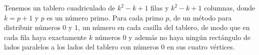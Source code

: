 Tenemos un tablero cuadriculado de $k^2 - k + 1$ filas y $k^2 - k + 1$ columnas, donde $k = p+1$ y $p$ es un número primo. Para cada primo $p$, de un método para distribuir números $0$ y $1$, un número en cada casilla del tablero, de modo que en cada fila haya exactamente $k$ números $0$ y además no haya ningún rectángulo de lados paralelos a los lados del tablero con números $0$ en sus cuatro vértices.
